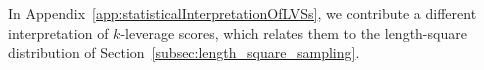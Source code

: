 \documentclass[twoside,11pt]{book}
\newtheorem{definition}{Definition}
\numberwithin{theorem}{chapter}
\numberwithin{definition}{chapter}
\numberwithin{proposition}{chapter}
\numberwithin{corollary}{chapter}
\numberwithin{example}{chapter}
\numberwithin{lemma}{chapter}
\numberwithin{assumption}{chapter}
\numberwithin{equation}{chapter}
\numberwithin{figure}{chapter}
\DeclareMathOperator{\Det}{Det}
\DeclareMathOperator{\Prb}{\mathbb{P}}
\begin{document}
In Appendix~\ref{app:statisticalInterpretationOfLVSs}, we contribute a different interpretation of $k$-leverage scores, which relates them to the length-square distribution of Section~\ref{subsec:length_square_sampling}.








\end{document}

